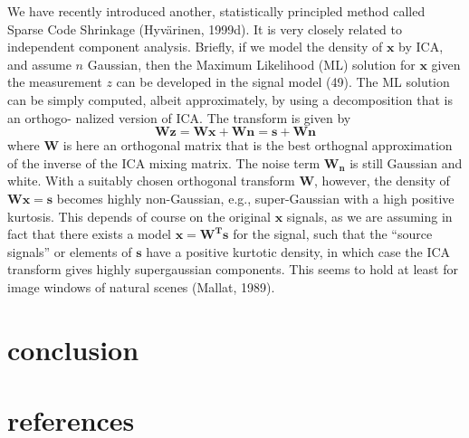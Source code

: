 \documentclass[12pt, a4paper, onecolumn]{IEEEtran}
\begin{document}
We have recently introduced another, statistically principled method called Sparse Code Shrinkage (Hyvärinen, 1999d). It is very closely related to independent component analysis. Briefly, if we model the density of $\mathbf{x}$ by ICA, and assume $n$ Gaussian, then the Maximum Likelihood (ML) solution for $\mathbf{x}$ given the measurement $z$ can be developed in the signal model (49).
The ML solution can be simply computed, albeit approximately, by using a decomposition that is an orthogo- nalized version of ICA. The transform is given by $$ \mathbf{Wz = Wx + Wn = s + Wn}$$ where $\mathbf{W}$ is here an orthogonal matrix that is the best orthognal approximation of the inverse of the ICA mixing matrix. The noise term $\mathbf{W_n}$ is still Gaussian and white. With a suitably chosen orthogonal transform $\mathbf{W}$, however, the density of $\mathbf{Wx = s}$ becomes highly non-Gaussian, e.g., super-Gaussian with a high positive kurtosis. This depends of course on the original $\mathbf{x}$ signals, as we are assuming in fact that there exists a model $\mathbf{x = W^Ts}$ for the signal, such that the “source signals” or elements of $\mathbf{s}$ have a positive kurtotic density, in which case the ICA transform gives highly supergaussian components. This seems to hold at least for image windows of natural scenes (Mallat, 1989).
\section{conclusion}
\section{references}
\end{document}
